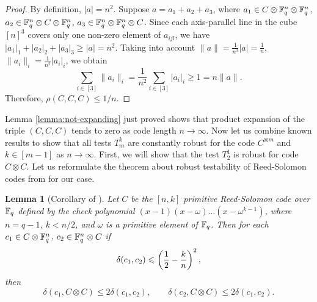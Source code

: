 \documentclass[11pt]{article}
\newtheorem{lemma}{Lemma}
\begin{document}
\begin{proof}
    By definition, $|a|=n^2$. Suppose $a=a_1+a_2+a_3$, where $a_1\in C\otimes \mathbb{F}_q^n\otimes \mathbb{F}_q^n$, $a_2\in \mathbb{F}_q^n\otimes C\otimes \mathbb{F}_q^n$, $a_3\in \mathbb{F}_q^n\otimes \mathbb{F}_q^n\otimes C$. Since each axis-parallel line in the cube $[n]^3$ covers only one non-zero element of $a_{ijl}$, we have $|a_1|_1+|a_2|_2+|a_3|_3\ge |a|=n^2$. 
    Taking into account $\|a\|=\frac{1}{n^3}|a|=\frac{1}{n}$, $\|a_i\|_i=\frac{1}{n^2}|a_i|_i$, we obtain 
    \[\sum_{i\in[3]}\|a_i\|_i=\frac{1}{n^2}\sum_{i\in[3]}|a_i|_i\ge 1 = n\|a\|.\]
    Therefore, $\rho(C,C,C)\le 1/n$.
\end{proof}
Lemma \ref{lemma:not-expanding} just proved shows that product expansion of the triple $(C,C,C)$ tends to zero as code length $n\to\infty$. 
Now let us combine known results to show that all tests $T_m^k$ are constantly robust for the code $C^{\otimes m}$ and $k\in[m-1]$ as $n\to\infty$.
First, we will show that the test $T_2^1$ is robust for code $C\otimes C$. Let us reformulate the theorem about robust testability of Reed-Solomon codes from \cite{Polishchuk:1994} for our case.
\begin{lemma}[{Corollary of \cite[Theorem 9]{Polishchuk:1994}
}]\label{th:RS-robust}
    Let $C$ be the $[n,k]$ primitive Reed-Solomon code over $\mathbb{F}_q$ defined by the check polynomial $(x-1)(x-\omega)\ldots (x-\omega^{k-1})$, where $n=q-1$, $k<n/2$, and $\omega$ is a primitive element of $\mathbb{F}_q$. Then for each $c_1\in C\otimes \mathbb{F}_q^n$, $c_2\in \mathbb{F}_q^n\otimes C$ if 
    $$\delta(c_1,c_2)\leqslant \left(\frac 12-\frac kn\right)^2,$$ 
    then 
    $$\delta(c_1,C\otimes C)\le 2\delta(c_1,c_2),\qquad\delta(c_2,C\otimes C)\le 2\delta(c_1,c_2).$$
\end{lemma}
\end{document}
